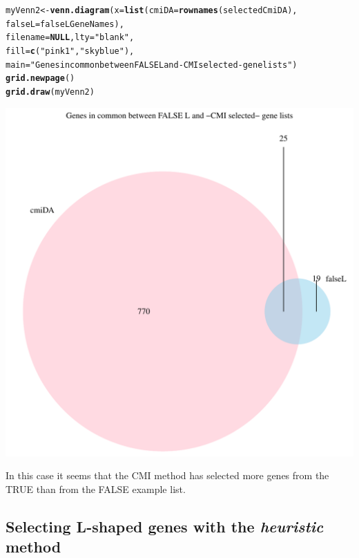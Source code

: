 \documentclass[a4paper,10pt]{article}\usepackage[]{graphicx}\usepackage[]{color}
\makeatletter
\def\maxwidth{ %
  \ifdim\Gin@nat@width>\linewidth
    \linewidth
  \else
    \Gin@nat@width
  \fi
}
\newcommand{\hlstr}[1]{\textcolor[rgb]{0.192,0.494,0.8}{#1}}%
\newcommand{\hlstd}[1]{\textcolor[rgb]{0.345,0.345,0.345}{#1}}%
\newcommand{\hlkwa}[1]{\textcolor[rgb]{0.161,0.373,0.58}{\textbf{#1}}}%
\newcommand{\hlkwb}[1]{\textcolor[rgb]{0.69,0.353,0.396}{#1}}%
\newcommand{\hlkwc}[1]{\textcolor[rgb]{0.333,0.667,0.333}{#1}}%
\newcommand{\hlkwd}[1]{\textcolor[rgb]{0.737,0.353,0.396}{\textbf{#1}}}%
\newenvironment{kframe}{%
 \def\at@end@of@kframe{}%
 \ifinner\ifhmode%
  \def\at@end@of@kframe{\end{minipage}}%
  \begin{minipage}{\columnwidth}%
 \fi\fi%
 \def\FrameCommand##1{\hskip\@totalleftmargin \hskip-\fboxsep
 \colorbox{shadecolor}{##1}\hskip-\fboxsep
     \hskip-\linewidth \hskip-\@totalleftmargin \hskip\columnwidth}%
 \MakeFramed {\advance\hsize-\width
   \@totalleftmargin\z@ \linewidth\hsize
   \@setminipage}}%
 {\par\unskip\endMakeFramed%
 \at@end@of@kframe}
\newenvironment{knitrout}{}{} %
\makeatother
\begin{document}
\begin{knitrout}
\color{fgcolor}\begin{kframe}
\begin{alltt}
\hlstd{myVenn2}\hlkwb{<-} \hlkwd{venn.diagram}\hlstd{(}\hlkwc{x}\hlstd{=}\hlkwd{list}\hlstd{(}\hlkwc{cmiDA}\hlstd{=}\hlkwd{rownames}\hlstd{(selectedCmiDA),}
                              \hlkwc{falseL}\hlstd{=falseLGeneNames),}
                              \hlkwc{filename}\hlstd{=}\hlkwa{NULL}\hlstd{,} \hlkwc{lty} \hlstd{=} \hlstr{"blank"}\hlstd{,}
                              \hlkwc{fill}\hlstd{=}\hlkwd{c}\hlstd{(}\hlstr{"pink1"}\hlstd{,} \hlstr{"skyblue"}\hlstd{),}
                       \hlkwc{main}\hlstd{=}\hlstr{"Genes in common between FALSE L and -CMI selected- gene lists"}\hlstd{)}
\hlkwd{grid.newpage}\hlstd{()}
\hlkwd{grid.draw}\hlstd{(myVenn2)}
\end{alltt}
\end{kframe}
\includegraphics[width=\maxwidth]{figure/cmiSelFalse-1} 

\end{knitrout}

In this case it seems that the CMI method has selected more genes from the TRUE than from the FALSE example list.


\subsection{Selecting L-shaped genes with the \emph{heuristic} method}
\end{document}
